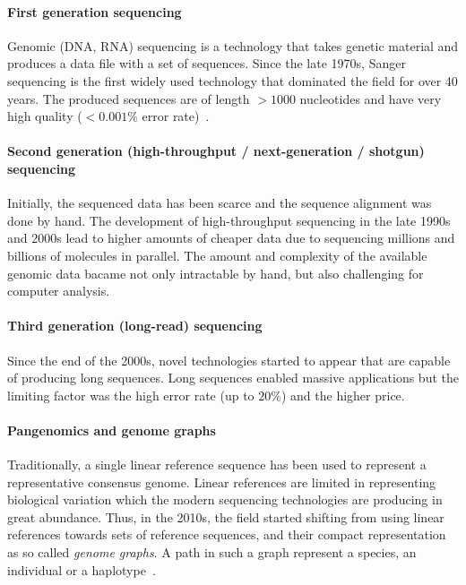 \paragraph{First generation sequencing}
Genomic (DNA, RNA) sequencing is a technology that takes genetic material and
produces a data file with a set of sequences. Since the late 1970s, Sanger
sequencing is the first widely used technology that dominated the field for over
40 years. The produced sequences are of length $>1000$ nucleotides and have very
high quality ($<0.001\%$ error rate)~\citep{shendure2008next}.

\paragraph{Second generation (high-throughput / next-generation / shotgun) sequencing}
Initially, the sequenced data has been scarce and the sequence alignment was
done by hand. The development of high-throughput sequencing in the late 1990s
and 2000s lead to higher amounts of cheaper data due to sequencing millions and
billions of molecules in parallel. The amount and complexity of the available
genomic data bacame not only intractable by hand, but also challenging for
computer analysis.

\paragraph{Third generation (long-read) sequencing}
Since the end of the 2000s, novel technologies started to appear that are
capable of producing long sequences. Long sequences enabled massive applications
but the limiting factor was the high error rate (up to $20\%$) and the higher
price.

\paragraph{Pangenomics and genome graphs}
Traditionally, a single linear reference sequence has been used to represent a
representative consensus genome. Linear references are limited in representing
biological variation which the modern sequencing technologies are producing in
great abundance. Thus, in the 2010s, the field started shifting from using
linear references towards sets of reference sequences, and their compact
representation as so called \emph{genome graphs}. A path in such a graph
represent a species, an individual or a
haplotype~\cite{dilthey_improved_2015,paten_genome_2017}.

